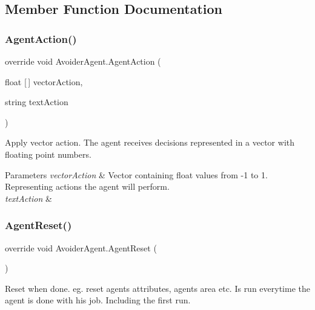 \subsection{Member Function Documentation}
\mbox{\label{class_avoider_agent_abfd20494a54e28c93e41f611959fdf05}} 
\subsubsection{\texorpdfstring{AgentAction()}{AgentAction()}}
{\footnotesize\ttfamily override void Avoider\+Agent.\+Agent\+Action (\begin{DoxyParamCaption}\item[{float \mbox{[}$\,$\mbox{]}}]{vector\+Action,  }\item[{string}]{text\+Action }\end{DoxyParamCaption})}



Apply vector action. The agent receives decisions represented in a vector with floating point numbers. 


\begin{DoxyParams}{Parameters}
{\em vector\+Action} & Vector containing float values from -\/1 to 1. Representing actions the agent will perform.\\
\hline
{\em text\+Action} & \\
\hline
\end{DoxyParams}
\mbox{\label{class_avoider_agent_a6c3b0dd60ad0cf044226598380f68cec}} 
\subsubsection{\texorpdfstring{AgentReset()}{AgentReset()}}
{\footnotesize\ttfamily override void Avoider\+Agent.\+Agent\+Reset (\begin{DoxyParamCaption}{ }\end{DoxyParamCaption})}



Reset when done. eg. reset agents attributes, agents area etc. Is run everytime the agent is done with his job. Including the first run. 

\mbox{\label{class_avoider_agent_ad0c2e2af7583acca8de21638dd33851b}} 
